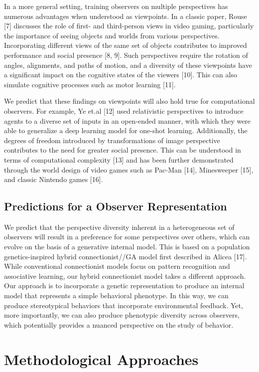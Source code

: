 \documentclass{article}
\begin{document}
In a more general setting, training observers on multiple perspectives has numerous advantages when understood as viewpoints. In a classic paper, Rouse [7] discusses the role of first- and third-person views in video gaming, particularly the importance of seeing objects and worlds from various perspectives. Incorporating different views of the same set of objects contributes to improved performance and social presence [8, 9]. Such perspectives require the rotation of angles, alignments, and paths of motion, and a diversity of these viewpoints have a significant impact on the cognitive states of the viewers [10]. This can also simulate cognitive processes such as motor learning [11]. 

We predict that these findings on viewpoints will also hold true for computational observers. For example, Ye et.al [12] used relativistic perspectives to introduce agents to a diverse set of inputs in an open-ended manner, with which they were able to generalize a deep learning model for one-shot learning. Additionally, the degrees of freedom introduced by transformations of image perspective contributes to the need for greater social presence. This can be understood in terms of computational complexity [13] and has been further demonstrated through the world design of video games such as Pac-Man [14], Minesweeper [15], and classic Nintendo games [16].

\subsection{Predictions for a Observer Representation}
We predict that the perspective diversity inherent in a heterogeneous set of observers will result in a preference for some perspectives over others, which can evolve on the basis of a generative internal model. This is based on a population genetics-inspired hybrid connectionist//GA model first described in Alicea [17]. While conventional connectionist models focus on pattern recognition and associative learning, our hybrid connectionist model takes a different approach. Our approach is to incorporate a genetic representation to produce an internal model that represents a simple behavioral phenotype. In this way, we can produce stereotypical behaviors that incorporate environmental feedback. Yet, more importantly, we can also produce phenotypic diversity across observers, which potentially provides a nuanced perspective on the study of behavior.

\section{Methodological Approaches}
\end{document}
